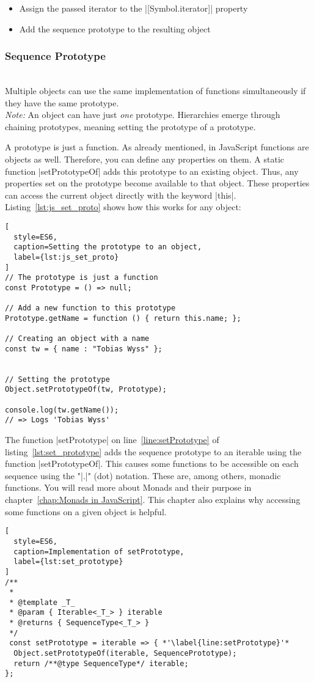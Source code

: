 \begin{itemize}
  \item{Assign the passed iterator to the |[Symbol.iterator]| property}
  \item{Add the sequence prototype to the resulting object}
\end{itemize}


\subsubsection{Sequence Prototype}
\label{subsub:Sequence Prototype}
\\ 
Multiple objects can use the same implementation of functions simultaneously if
they have the same prototype.\\
\textit{Note:} An object can have just \textit{one} prototype. Hierarchies
emerge through chaining prototypes, meaning setting the prototype of a
prototype.

A prototype is just a function. As already mentioned, in JavaScript functions
are objects as well. Therefore, you can define any properties on them. A static
function |setPrototypeOf| adds this prototype to an existing object. Thus, any
properties set on the prototype become available to that object. These
properties can access the current object directly with the keyword |this|.
Listing~\ref{lst:js_set_proto} shows how this works for any object:

\begin{lstlisting}[
  style=ES6,
  caption=Setting the prototype to an object,
  label={lst:js_set_proto}
]
// The prototype is just a function
const Prototype = () => null; 

// Add a new function to this prototype
Prototype.getName = function () { return this.name; };

// Creating an object with a name
const tw = { name : "Tobias Wyss" };


// Setting the prototype
Object.setPrototypeOf(tw, Prototype);

console.log(tw.getName());
// => Logs 'Tobias Wyss' 
\end{lstlisting}


The function |setPrototype| on line~\ref{line:setPrototype} of
listing~\ref{lst:set_prototype} adds the sequence prototype to an iterable
using the function |setPrototypeOf|. This causes some functions to be
accessible on each sequence using the "|.|" (dot) notation. These are, among
others, monadic functions. You will read more about Monads and their purpose in
chapter~\ref{chap:Monads in JavaScript}. 
This chapter also explains why accessing some functions on a given object is helpful.
\begin{lstlisting}[
  style=ES6,
  caption=Implementation of setPrototype,
  label={lst:set_prototype}
]
/**
 *
 * @template _T_
 * @param { Iterable<_T_> } iterable
 * @returns { SequenceType<_T_> }
 */
 const setPrototype = iterable => { *'\label{line:setPrototype}'*
  Object.setPrototypeOf(iterable, SequencePrototype);
  return /**@type SequenceType*/ iterable;
};
\end{lstlisting}

